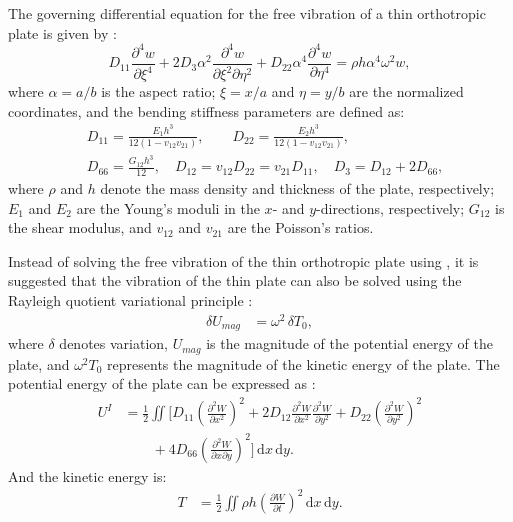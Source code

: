 \documentclass[preprint,12pt]{elsarticle}
\begin{document}
The governing differential equation for the free vibration of a thin orthotropic plate is given by \citep{xing2020improved}:  
%
\begin{equation}\label{eq:governing_EOM}
	D_{11}\frac{\partial^4w}{\partial \xi^4} + 2D_3\alpha^2\frac{\partial^4w}{\partial \xi^2 \partial \eta^2} + D_{22}\alpha^4\frac{\partial^4w}{\partial \eta^4} = \rho h\alpha^4\omega^2w,
\end{equation}
%
where $ \alpha = a / b $ is the aspect ratio; $ \xi = x / a $ and $ \eta = y / b $ are the normalized coordinates,
and the bending stiffness parameters are defined as:
%
\begin{equation}\label{eq:bd_stiff}
	\begin{split}
		&D_{11} = \frac{E_1h^3}{12(1-v_{12}v_{21})}, \qquad D_{22} = \frac{E_2h^3}{12(1-v_{12}v_{21})}, \\  
		&D_{66} = \frac{G_{12}h^3}{12}, \quad D_{12} = v_{12}D_{22} = v_{21}D_{11}, \quad D_3 = D_{12} + 2D_{66},
	\end{split}
\end{equation}
%
where $\rho$ and $h$ denote the mass density and thickness of the plate, respectively; $E_1$ and $E_2$ are the Young’s moduli in the $x$- and $y$-directions, respectively; $G_{12}$ is the shear modulus, and $v_{12}$ and $v_{21}$ are the Poisson’s ratios.

Instead of solving the free vibration of the thin orthotropic plate using , it is suggested that the vibration of the thin plate can also be solved using the Rayleigh quotient variational principle \cite{xing2018overall}:
%
\begin{equation}\label{eq:Rayleigh}
	\begin{split}
		\delta U_{mag} &= \omega^2\,\delta T_0,
	\end{split}
\end{equation}
%
where $\delta$ denotes variation, $U_{mag}$ is the magnitude of the potential energy of the plate, and $\omega^2 T_0$ represents the magnitude of the kinetic energy of the plate.
The potential energy of the plate can be expressed as \cite{xing2020extended}:
%
\begin{equation}\label{eq:poten_energy}
	\begin{split}
		U^{I} &= \frac{1}{2}\iint \Big[D_{11}\left(\frac{\partial^2 W}{\partial x^2}\right)^2 + 2D_{12}\frac{\partial^2 W}{\partial x^2}\frac{\partial^2 W}{\partial y^2} + D_{22}\left(\frac{\partial^2 W}{\partial y^2}\right)^2 \\
		&\qquad + 4D_{66}\left(\frac{\partial^2 W}{\partial x \partial y}\right)^2\Big] \, \mathrm{d}x \, \mathrm{d}y.
	\end{split}
\end{equation}
%
And the kinetic energy is:
%
\begin{equation}\label{eq:kine_energy}
	\begin{split}
		T &= \frac{1}{2}\iint \rho h \left(\frac{\partial W}{\partial t}\right)^2 \, \mathrm{d}x \, \mathrm{d}y.
	\end{split}
\end{equation}
\end{document}
